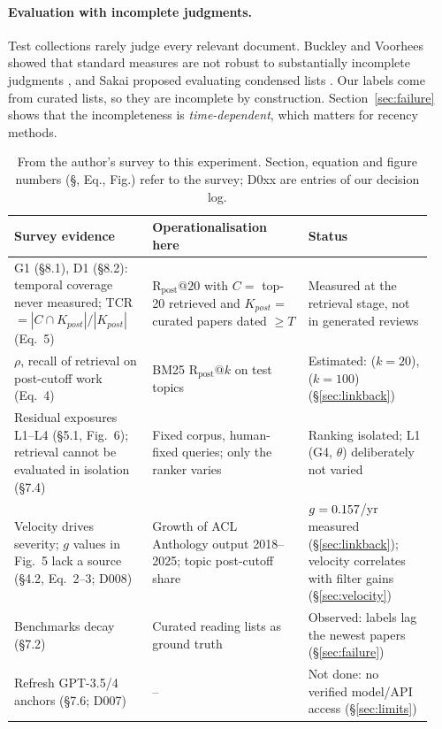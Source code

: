 \documentclass[acmsmall]{acmart}
\makeatletter
\newcommand{\Rpost}{\mathrm{R}_{\text{post}}@20}
\makeatother
\begin{document}
\paragraph{Evaluation with incomplete judgments.} Test collections rarely judge every relevant document. Buckley and Voorhees showed that standard measures are not robust to substantially incomplete judgments \cite{buckley2004incomplete}, and Sakai proposed evaluating condensed lists \cite{sakai2007bpref}. Our labels come from curated lists, so they are incomplete by construction. Section~\ref{sec:failure} shows that the incompleteness is \emph{time-dependent}, which matters for recency methods.

\begin{table}[t]
\caption{From the author's survey \cite{ownreview2026} to this experiment. Section, equation and figure numbers (\S, Eq., Fig.) refer to the survey; D0xx are entries of our decision log.}\label{tab:bridge}
\small
\begin{tabular}{@{}L{0.31\linewidth}L{0.35\linewidth}L{0.28\linewidth}@{}}
\toprule
Survey evidence & Operationalisation here & Status \\
\midrule
G1 (\S8.1), D1 (\S8.2): temporal coverage never measured; TCR $=|C\cap K_{post}|/|K_{post}|$ (Eq.~5) & $\Rpost$ with $C=$ top-20 retrieved and $K_{post}=$ curated papers dated $\geq T$ & Measured at the retrieval stage, not in generated reviews \\
$\rho$, recall of retrieval on post-cutoff work (Eq.~4) & BM25 $\mathrm{R}_{\text{post}}@k$ on test topics & Estimated: \RhoTwenty{} ($k{=}20$), \RhoHundred{} ($k{=}100$) (\S\ref{sec:linkback}) \\
Residual exposures L1--L4 (\S5.1, Fig.~6); retrieval cannot be evaluated in isolation (\S7.4) & Fixed corpus, human-fixed queries; only the ranker varies & Ranking isolated; L1 (G4, $\theta$) deliberately not varied \\
Velocity drives severity; $g$ values in Fig.~5 lack a source (\S4.2, Eq.~2--3; D008) & Growth of ACL Anthology output 2018--2025; topic post-cutoff share & $g=0.157$/yr measured (\S\ref{sec:linkback}); velocity correlates with filter gains (\S\ref{sec:velocity}) \\
Benchmarks decay (\S7.2) & Curated reading lists as ground truth & Observed: labels lag the newest papers (\S\ref{sec:failure}) \\
Refresh GPT-3.5/4 anchors (\S7.6; D007) & -- & Not done: no verified model/API access (\S\ref{sec:limits}) \\
\bottomrule
\end{tabular}
\end{table}
\end{document}
